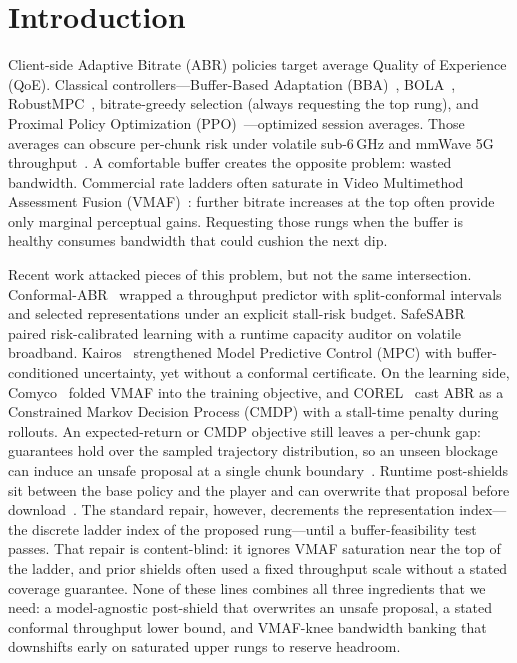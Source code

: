 \section{Introduction}
\label{sec:intro}

Client-side Adaptive Bitrate (ABR) policies target average Quality of Experience (QoE).
Classical controllers---Buffer-Based Adaptation (BBA)~\cite{huang2014buffer}, BOLA~\cite{spiteri2018bola}, RobustMPC~\cite{yin2015control}, bitrate-greedy selection (always requesting the top rung), and Proximal Policy Optimization (PPO)~\cite{mao2017neural,schulman2017proximal}---optimized session averages.
Those averages can obscure per-chunk risk under volatile sub-6\,GHz and mmWave \mbox{5G} throughput~\cite{narayanan2021variegated,cisco2023,seufert2015survey}.
A comfortable buffer creates the opposite problem: wasted bandwidth.
Commercial rate ladders often saturate in Video Multimethod Assessment Fusion (VMAF)~\cite{li2016vmaf}: further bitrate increases at the top often provide only marginal perceptual gains.
Requesting those rungs when the buffer is healthy consumes bandwidth that could cushion the next dip.

Recent work attacked pieces of this problem, but not the same intersection.
Conformal-ABR~\cite{zhong2026conformalabr} wrapped a throughput predictor with split-conformal intervals and selected representations under an explicit stall-risk budget.
SafeSABR~\cite{liu2025safesabr} paired risk-calibrated learning with a runtime capacity auditor on volatile broadband.
Kairos~\cite{zhong2025kairos} strengthened Model Predictive Control (MPC) with buffer-conditioned uncertainty, yet without a conformal certificate.
On the learning side, Comyco~\cite{huang2019comyco} folded VMAF into the training objective, and COREL~\cite{hu2023corel} cast ABR as a Constrained Markov Decision Process (CMDP) with a stall-time penalty during rollouts.
An expected-return or CMDP objective still leaves a per-chunk gap: guarantees hold over the sampled trajectory distribution, so an unseen blockage can induce an unsafe proposal at a single chunk boundary~\cite{hu2023corel,gu2024safereview}.
Runtime post-shields sit between the base policy and the player and can overwrite that proposal before download~\cite{alshiekh2018shielding,konighofer2025shields}.
The standard repair, however, decrements the representation index---the discrete ladder index of the proposed rung---until a buffer-feasibility test passes.
That repair is content-blind: it ignores VMAF saturation near the top of the ladder, and prior shields often used a fixed throughput scale without a stated coverage guarantee.
None of these lines combines all three ingredients that we need: a model-agnostic post-shield that overwrites an unsafe proposal, a stated conformal throughput lower bound, and VMAF-knee bandwidth banking that downshifts early on saturated upper rungs to reserve headroom.

